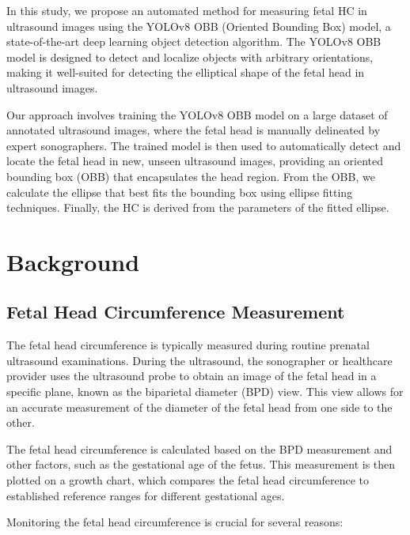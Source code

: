 \documentclass[14pt]{extreport}
\begin{document}
In this study, we propose an automated method for measuring fetal HC in ultrasound images using the YOLOv8 OBB (Oriented Bounding Box) model, a state-of-the-art deep learning object detection algorithm. The YOLOv8 OBB model is designed to detect and localize objects with arbitrary orientations, making it well-suited for detecting the elliptical shape of the fetal head in ultrasound images.

Our approach involves training the YOLOv8 OBB model on a large dataset of annotated ultrasound images, where the fetal head is manually delineated by expert sonographers. The trained model is then used to automatically detect and locate the fetal head in new, unseen ultrasound images, providing an oriented bounding box (OBB) that encapsulates the head region. From the OBB, we calculate the ellipse that best fits the bounding box using ellipse fitting techniques. Finally, the HC is derived from the parameters of the fitted ellipse.


\clearpage
\chapter{Background}

\section{Fetal Head Circumference Measurement}

The fetal head circumference is typically measured during routine prenatal ultrasound examinations. During the ultrasound, the sonographer or healthcare provider uses the ultrasound probe to obtain an image of the fetal head in a specific plane, known as the biparietal diameter (BPD) view. This view allows for an accurate measurement of the diameter of the fetal head from one side to the other.

The fetal head circumference is calculated based on the BPD measurement and other factors, such as the gestational age of the fetus. This measurement is then plotted on a growth chart, which compares the fetal head circumference to established reference ranges for different gestational ages.

Monitoring the fetal head circumference is crucial for several reasons:
\end{document}
